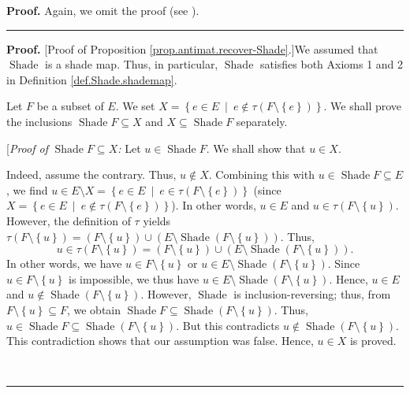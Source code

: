 \documentclass[numbers=enddot,12pt,final,onecolumn]{scrartcl}%
\theoremstyle{definition}
\newenvironment{proof}[1][Proof]{\noindent\textbf{#1.} }{\ \rule{0.5em}{0.5em}}
\newenvironment{verlong}{}{}
\newenvironment{vershort}{}{}
\begin{document}
\begin{vershort}


\begin{proof}
Again, we omit the proof (see \cite{verlong}).
\end{proof}
\end{vershort}

\begin{verlong}


\begin{proof}
[Proof of Proposition \ref{prop.antimat.recover-Shade}.]We assumed that
$\operatorname*{Shade}$ is a shade map. Thus, in particular,
$\operatorname*{Shade}$ satisfies both Axioms 1 and 2 in Definition
\ref{def.Shade.shademap}.

Let $F$ be a subset of $E$. We set $X=\left\{  e\in E\ \mid\ e\notin%
\tau\left(  F\setminus\left\{  e\right\}  \right)  \right\}  $. We shall prove
the inclusions $\operatorname*{Shade}F\subseteq X$ and $X\subseteq
\operatorname*{Shade}F$ separately.

[\textit{Proof of }$\operatorname*{Shade}F\subseteq X$\textit{:} Let
$u\in\operatorname*{Shade}F$. We shall show that $u\in X$.

Indeed, assume the contrary. Thus, $u\notin X$. Combining this with
$u\in\operatorname*{Shade}F\subseteq E$, we find $u\in E\setminus X=\left\{
e\in E\ \mid\ e\in\tau\left(  F\setminus\left\{  e\right\}  \right)  \right\}
$ (since $X=\left\{  e\in E\ \mid\ e\notin\tau\left(  F\setminus\left\{
e\right\}  \right)  \right\}  $). In other words, $u\in E$ and $u\in
\tau\left(  F\setminus\left\{  u\right\}  \right)  $. However, the definition
of $\tau$ yields $\tau\left(  F\setminus\left\{  u\right\}  \right)  =\left(
F\setminus\left\{  u\right\}  \right)  \cup\left(  E\setminus
\operatorname*{Shade}\left(  F\setminus\left\{  u\right\}  \right)  \right)
$. Thus,%
\[
u\in\tau\left(  F\setminus\left\{  u\right\}  \right)  =\left(  F\setminus
\left\{  u\right\}  \right)  \cup\left(  E\setminus\operatorname*{Shade}%
\left(  F\setminus\left\{  u\right\}  \right)  \right)  .
\]
In other words, we have $u\in F\setminus\left\{  u\right\}  $ or $u\in
E\setminus\operatorname*{Shade}\left(  F\setminus\left\{  u\right\}  \right)
$. Since $u\in F\setminus\left\{  u\right\}  $ is impossible, we thus have
$u\in E\setminus\operatorname*{Shade}\left(  F\setminus\left\{  u\right\}
\right)  $. Hence, $u\in E$ and $u\notin\operatorname*{Shade}\left(
F\setminus\left\{  u\right\}  \right)  $. However, $\operatorname*{Shade}$ is
inclusion-reversing; thus, from $F\setminus\left\{  u\right\}  \subseteq F$,
we obtain $\operatorname*{Shade}F\subseteq\operatorname*{Shade}\left(
F\setminus\left\{  u\right\}  \right)  $. Thus, $u\in\operatorname*{Shade}%
F\subseteq\operatorname*{Shade}\left(  F\setminus\left\{  u\right\}  \right)
$. But this contradicts $u\notin\operatorname*{Shade}\left(  F\setminus
\left\{  u\right\}  \right)  $. This contradiction shows that our assumption
was false. Hence, $u\in X$ is proved.


\end{proof}
\end{verlong}
\end{document}
